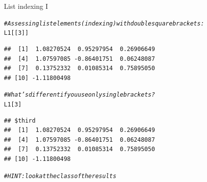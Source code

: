 \documentclass[xcolor=table,       handout,    xcolor=dvipsnames]{beamer}\usepackage[]{graphicx}\usepackage[]{color}
\makeatletter
\newcommand{\hlnum}[1]{\textcolor[rgb]{0,0,0}{#1}}
\newcommand{\hlcom}[1]{\textcolor[rgb]{0,0.392,0}{\textit{#1}}}
\newcommand{\hlstd}[1]{\textcolor[rgb]{0,0,0}{#1}}
\newenvironment{kframe}{%
 \def\at@end@of@kframe{}%
 \ifinner\ifhmode%
  \def\at@end@of@kframe{\end{minipage}}%
  \begin{minipage}{\columnwidth}%
 \fi\fi%
 \def\FrameCommand##1{\hskip\@totalleftmargin \hskip-\fboxsep
 \colorbox{shadecolor}{##1}\hskip-\fboxsep
     \hskip-\linewidth \hskip-\@totalleftmargin \hskip\columnwidth}%
 \MakeFramed {\advance\hsize-\width
   \@totalleftmargin\z@ \linewidth\hsize
   \@setminipage}}%
 {\par\unskip\endMakeFramed%
 \at@end@of@kframe}
\newenvironment{knitrout}{}{} %
\makeatother
\begin{document}

\begin{frame}[fragile]{List indexing I}
\begin{knitrout}\small
{}\color{fgcolor}\begin{kframe}
\begin{alltt}
\hlcom{# Assessing list elements (indexing) with double square brackets:}
\hlstd{L1[[}\hlnum{3}\hlstd{]]}
\end{alltt}
\begin{verbatim}
##  [1]  1.08270524  0.95297954  0.26906649
##  [4]  1.07597085 -0.86401751  0.06248087
##  [7]  0.13752332  0.01085314  0.75895050
## [10] -1.11800498
\end{verbatim}
\end{kframe}
\end{knitrout}
\pause
\begin{knitrout}\small
{}\color{fgcolor}\begin{kframe}
\begin{alltt}
\hlcom{# What's different if you use only single brackets?}
\hlstd{L1[}\hlnum{3}\hlstd{]}
\end{alltt}
\begin{verbatim}
## $third
##  [1]  1.08270524  0.95297954  0.26906649
##  [4]  1.07597085 -0.86401751  0.06248087
##  [7]  0.13752332  0.01085314  0.75895050
## [10] -1.11800498
\end{verbatim}
\begin{alltt}
\hlcom{# HINT: look at the class of the results}
\end{alltt}
\end{kframe}
\end{knitrout}
\end{frame}

\end{document}
